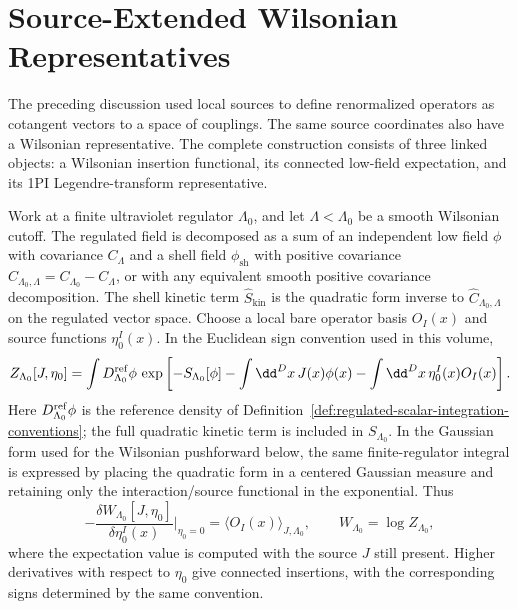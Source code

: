\section{Source-Extended Wilsonian Representatives}

The preceding discussion used local sources to define renormalized operators
as cotangent vectors to a space of couplings.  The same source coordinates
also have a Wilsonian representative.  The complete construction consists of
three linked objects: a Wilsonian insertion functional, its connected
low-field expectation, and its 1PI Legendre-transform representative.

Work at a finite ultraviolet regulator \(\Lambda_0\), and let
\(\Lambda<\Lambda_0\) be a smooth Wilsonian cutoff.  The regulated field is
decomposed as a sum of an independent low field \(\phi\) with covariance
\(C_\Lambda\) and a shell field \(\phi_{\mathrm{sh}}\) with positive covariance
\(\widehat C_{\Lambda_0,\Lambda}=C_{\Lambda_0}-C_\Lambda\), or with any
equivalent smooth positive covariance decomposition.  The shell kinetic term
\(\widehat S_{\mathrm{kin}}\) is the quadratic form inverse to
\(\widehat C_{\Lambda_0,\Lambda}\) on the regulated vector space.  Choose a
local bare operator basis \(O_I(x)\) and source functions \(\eta_0^I(x)\).  In
the Euclidean sign convention used in this volume,
\[
  Z_{\Lambda_0}[J,\eta_0]
  =
  \int D_{\Lambda_0}^{\rm ref}\phi\,
  \exp\left[
    -S_{\Lambda_0}[\phi]
    -\int\dd^D x\,J(x)\phi(x)
    -\int\dd^D x\,\eta_0^I(x)O_I(x)
  \right].
\]
Here \(D_{\Lambda_0}^{\rm ref}\phi\) is the reference density of
Definition~\ref{def:regulated-scalar-integration-conventions}; the full
quadratic kinetic term is included in \(S_{\Lambda_0}\).  In the Gaussian
form used for the Wilsonian pushforward below, the same finite-regulator
integral is expressed by placing the quadratic form in a centered Gaussian
measure and retaining only the interaction/source functional in the
exponential.
Thus
\[
  -\frac{\delta W_{\Lambda_0}[J,\eta_0]}
          {\delta\eta_0^I(x)}
  \bigg|_{\eta_0=0}
  =
  \bigl\langle O_I(x)\bigr\rangle_{J,\Lambda_0},
  \qquad
  W_{\Lambda_0}=\log Z_{\Lambda_0},
\]
where the expectation value is computed with the source \(J\) still present.
Higher derivatives with respect to \(\eta_0\) give connected insertions, with
the corresponding signs determined by the same convention.

